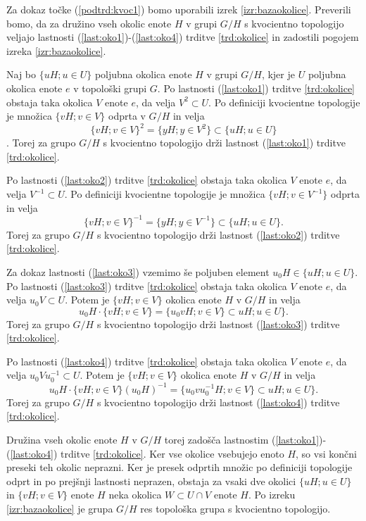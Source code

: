 \documentclass[mat1]{fmfdelo}
\begin{document}
\begin{dokaz}
Za dokaz točke (\ref{podtrd:kvoc1}) bomo uporabili izrek \ref{izr:bazaokolice}. Preverili bomo, da za družino vseh okolic enote $H$ v grupi $G/H$ s kvocientno topologijo veljajo lastnosti (\ref{last:oko1})-(\ref{last:oko4}) trditve \ref{trd:okolice} in zadostili pogojem izreka \ref{izr:bazaokolice}.

Naj bo $\lbrace uH ; u \in U \rbrace$ poljubna okolica enote $H$ v grupi $G/H$, kjer je $U$ poljubna okolica enote $e$ v topološki grupi $G$. Po lastnosti (\ref{last:oko1}) trditve \ref{trd:okolice} obstaja taka okolica $V$ enote $e$, da velja $V^2 \subset U$. Po definiciji kvocientne topologije je množica $\lbrace vH ; v \in V \rbrace$ odprta v $G/H$ in velja \[\lbrace vH ; v \in V \rbrace^2 = \lbrace yH ; y \in V^2 \rbrace \subset \lbrace uH ; u \in U \rbrace\]. Torej za grupo $G/H$ s kvocientno topologijo drži lastnost (\ref{last:oko1}) trditve \ref{trd:okolice}.

Po lastnosti (\ref{last:oko2}) trditve \ref{trd:okolice} obstaja taka okolica $V$ enote $e$, da velja $V^{-1} \subset U$. Po definiciji kvocientne topologije je množica $\lbrace vH ; v \in V^{-1} \rbrace$ odprta in velja \[\lbrace vH ; v \in V \rbrace^{-1} = \lbrace yH ; y \in V^{-1} \rbrace \subset \lbrace uH ; u \in U \rbrace.\] Torej za grupo $G/H$ s kvocientno topologijo drži lastnost (\ref{last:oko2}) trditve \ref{trd:okolice}.

Za dokaz lastnosti (\ref{last:oko3}) vzemimo še poljuben element $u_0H \in \lbrace uH ; u \in U \rbrace$. Po lastnosti (\ref{last:oko3}) trditve \ref{trd:okolice} obstaja taka okolica $V$ enote $e$, da velja $u_0V \subset U$. Potem je $\lbrace vH ; v \in V \rbrace$ okolica enote $H$ v $G/H$ in velja \[u_0H\cdot\lbrace vH ; v \in V\rbrace = \lbrace u_0vH ; v \in V \rbrace \subset uH ; u \in U \rbrace.\] Torej za grupo $G/H$ s kvocientno topologijo drži lastnost (\ref{last:oko3}) trditve \ref{trd:okolice}.

Po lastnosti (\ref{last:oko4}) trditve \ref{trd:okolice} obstaja taka okolica $V$ enote $e$, da velja $u_0Vu_0^{-1} \subset U$. Potem je $\lbrace vH ; v \in V \rbrace$ okolica enote $H$ v $G/H$ in velja
\[u_0H\cdot\lbrace vH ; v \in V\rbrace (u_0H)^{-1} = \lbrace u_0vu_0^{-1}H ; v \in V \rbrace \subset uH ; u \in U \rbrace.\]
Torej za grupo $G/H$ s kvocientno topologijo drži lastnost (\ref{last:oko4}) trditve \ref{trd:okolice}.

Družina vseh okolic enote $H$ v $G/H$ torej zadošča lastnostim (\ref{last:oko1})-(\ref{last:oko4}) trditve \ref{trd:okolice}. Ker vse okolice vsebujejo enoto $H$, so vsi končni preseki teh okolic neprazni. Ker je presek odprtih množic po definiciji topologije odprt in po prejšnji lastnosti neprazen, obstaja za vsaki dve okolici $\lbrace uH ; u \in U \rbrace$ in $\lbrace vH ; v \in V \rbrace$ enote $H$ neka okolica $W \subset U \cap V$ enote $H$. Po izreku \ref{izr:bazaokolice} je grupa $G/H$ res topološka grupa s kvocientno topologijo.


\end{dokaz}
\end{document}
